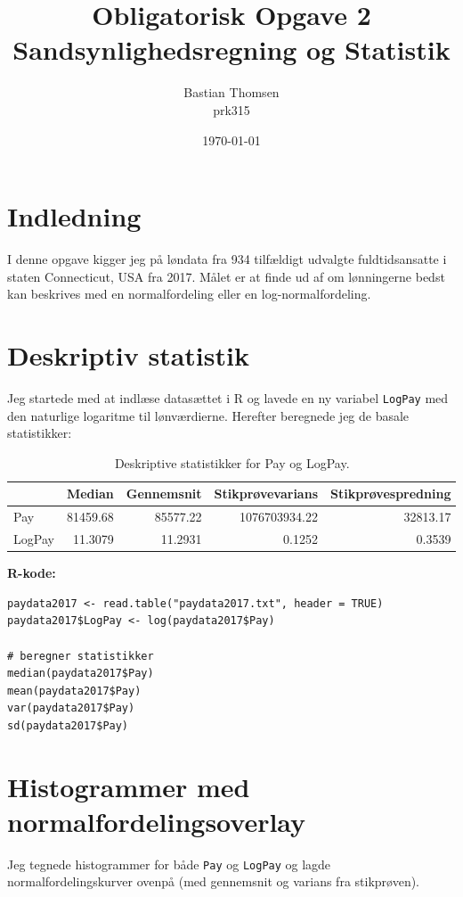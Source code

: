 \documentclass[11pt,a4paper]{article}
\title{\textbf{Obligatorisk Opgave 2} \\ Sandsynlighedsregning og Statistik}
\author{Bastian Thomsen \\ prk315}
\date{\today}
\begin{document}
\maketitle

\section*{Indledning}
I denne opgave kigger jeg på løndata fra 934 tilfældigt udvalgte fuldtidsansatte i staten Connecticut, USA fra 2017. Målet er at finde ud af om lønningerne bedst kan beskrives med en normalfordeling eller en log-normalfordeling.

\section{Deskriptiv statistik}

Jeg startede med at indlæse datasættet i R og lavede en ny variabel \texttt{LogPay} med den naturlige logaritme til lønværdierne. Herefter beregnede jeg de basale statistikker:

\begin{table}[H]
\centering
\begin{tabular}{lrrrr}
\toprule
& Median & Gennemsnit & Stikprøvevarians & Stikprøvespredning \\
\midrule
Pay & 81459.68 & 85577.22 & 1076703934.22 & 32813.17 \\
LogPay & 11.3079 & 11.2931 & 0.1252 & 0.3539 \\
\bottomrule
\end{tabular}
\caption{Deskriptive statistikker for Pay og LogPay.}
\label{tab:descriptive}
\end{table}

\textbf{R-kode:}
\begin{lstlisting}
paydata2017 <- read.table("paydata2017.txt", header = TRUE)
paydata2017$LogPay <- log(paydata2017$Pay)

# beregner statistikker
median(paydata2017$Pay)
mean(paydata2017$Pay)
var(paydata2017$Pay)
sd(paydata2017$Pay)
\end{lstlisting}

\section{Histogrammer med normalfordelingsoverlay}

Jeg tegnede histogrammer for både \texttt{Pay} og \texttt{LogPay} og lagde normalfordelingskurver ovenpå (med gennemsnit og varians fra stikprøven).
\end{document}

